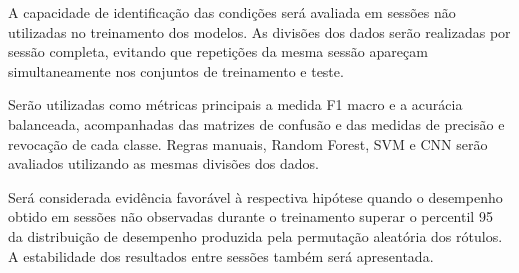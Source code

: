 A capacidade de identificação das condições será avaliada em sessões
não utilizadas no treinamento dos modelos. As divisões dos dados serão
realizadas por sessão completa, evitando que repetições da mesma sessão
apareçam simultaneamente nos conjuntos de treinamento e teste.

Serão utilizadas como métricas principais a medida F1 macro e a
acurácia balanceada, acompanhadas das matrizes de confusão e das medidas
de precisão e revocação de cada classe. Regras manuais, Random Forest,
SVM e CNN serão avaliados utilizando as mesmas divisões dos dados.

Será considerada evidência favorável à respectiva hipótese quando o
desempenho obtido em sessões não observadas durante o treinamento
superar o percentil 95 da distribuição de desempenho produzida pela
permutação aleatória dos rótulos. A estabilidade dos resultados entre
sessões também será apresentada.

